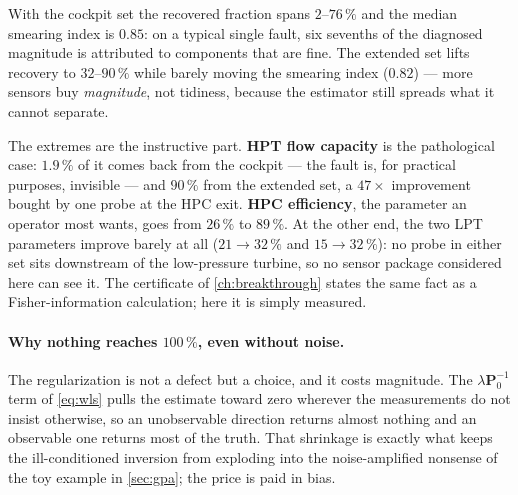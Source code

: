 \begin{table}[htbp]
  \centering\small
  \caption{The GPA scorecard for this engine, per health parameter and sensor set: magnitude
  recovered, smearing index, correct-isolation rate at a $1\,\%$ fault, and the smallest fault
  the nearest-signature rule names correctly in $90\,\%$ of noisy draws. Auto-generated from
  \texttt{scripts/gpa\_study.py}.}
  \label{tab:gpa-study}
  
\end{table}

With the cockpit set the recovered fraction spans $2$--$76\,\%$ and the median smearing index
is $0.85$: on a typical single fault, six sevenths of the diagnosed magnitude is attributed to
components that are fine. The extended set lifts recovery to $32$--$90\,\%$ while barely
moving the smearing index ($0.82$) --- more sensors buy \emph{magnitude}, not tidiness, because
the estimator still spreads what it cannot separate.

The extremes are the instructive part. \textbf{HPT flow capacity} is the pathological case:
$1.9\,\%$ of it comes back from the cockpit --- the fault is, for practical purposes, invisible
--- and $90\,\%$ from the extended set, a $47\times$ improvement bought by one probe at the HPC
exit. \textbf{HPC efficiency}, the parameter an operator most wants, goes from $26\,\%$ to
$89\,\%$. At the other end, the two LPT parameters improve barely at all ($21\to32\,\%$ and
$15\to32\,\%$): no probe in either set sits downstream of the low-pressure turbine, so no
sensor package considered here can see it. The certificate of \cref{ch:breakthrough} states
the same fact as a Fisher-information calculation; here it is simply measured.

\paragraph{Why nothing reaches $100\,\%$, even without noise.} The regularization is not a
defect but a choice, and it costs magnitude. The $\lambda\mathbf{P}_0^{-1}$ term of
\cref{eq:wls} pulls the estimate toward zero wherever the measurements do not insist
otherwise, so an unobservable direction returns almost nothing and an observable one returns
most of the truth. That shrinkage is exactly what keeps the ill-conditioned inversion from
exploding into the noise-amplified nonsense of the toy example in \cref{sec:gpa}; the price is
paid in bias.

